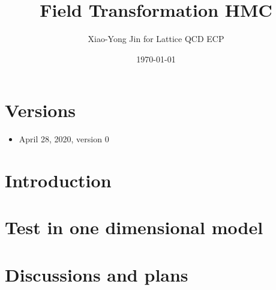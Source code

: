 


\author{Xiao-Yong Jin for Lattice QCD ECP}
\date{\today}
\title{Field Transformation HMC}


\maketitle
\tableofcontents

\section*{Versions}
\label{sec:versions}

\begin{itemize}
\item April 28, 2020, version 0
\end{itemize}

\section{Introduction}
\label{sec:intro}


\section{Test in one dimensional model}
\label{sec:test-1d}


\section{Discussions and plans}
\label{sec:discuss-plans}


\ifdefined\directlua
  \printbibliography
\else
  
  
\fi


